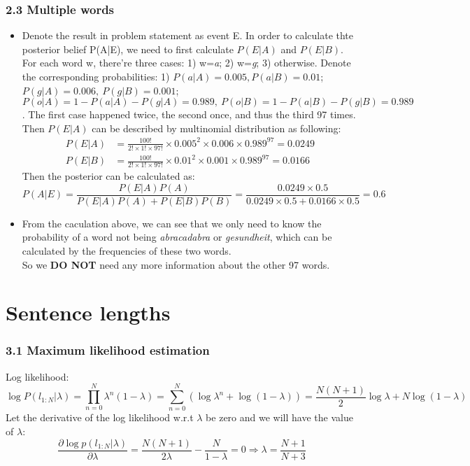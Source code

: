 \documentclass[twoside,10pt]{article}
\begin{document}
\subsubsection*{2.3 Multiple words}
\begin{itemize}
  \item Denote the result in problem statement as event E. In order to calculate
  thte posterior belief P(A|E), we need to first calculate $P(E|A)$ and
  $P(E|B)$. For each
  word w, there're three cases: 1) w=\textit{a}; 2) w=\textit{g}; 3) otherwise.
  Denote the corresponding probabilities: 1) $P(a|A) = 0.005, P(a|B) = 0.01$;
  $P(g|A) = 0.006,\ P(g|B) = 0.001$;
  $P(o|A) = 1 - P(a|A) - P(g|A) = 0.989,\ P(o|B) = 1 - P(a|B) - P(g|B)=0.989$. The first case happened twice, the
  second once, and thus the third 97 times. Then $P(E|A)$ can be described by
  multinomial distribution as following:
  \begin{align} 
    P(E|A) &=
    \frac{100!}{2!\times1!\times97!}\times0.005^{2}\times0.006\times0.989^{97} =
    0.0249\\
    P(E|B) &=
    \frac{100!}{2!\times1!\times97!}\times0.01^{2}\times0.001\times0.989^{97} =
    0.0166
  \end{align}
  Then the posterior can be calculated as:
  \begin{equation}
    P(A|E) = \frac{P(E|A)P(A)}{P(E|A)P(A)+P(E|B)P(B)} =
    \frac{0.0249\times0.5}{0.0249\times0.5+0.0166\times0.5} = 0.6 
  \end{equation}

\item From the caculation above, we can see that we only need to know the
  probability of a word not being \textit{abracadabra} or \textit{gesundheit},
  which can be calculated by the frequencies of these two words.\\ 
  So we \textbf{DO NOT}
  need any more information about the other 97 words.
\end{itemize}
\section{Sentence lengths}
\subsubsection*{3.1 Maximum likelihood estimation}
Log likelihood:
\begin{equation}
  \log P(l_{1:N}|\lambda) = \prod_{n=0}^{N}\lambda^n(1-\lambda) =
  \sum_{n=0}^{N} (\log\lambda^n + \log(1-\lambda)) = \frac{N(N+1)}{2}\log\lambda
  + N\log(1-\lambda)
\end{equation}
Let the derivative of the log likelihood w.r.t $\lambda$ be zero and we will
have the value of $\lambda$:
\begin{equation}
  \frac{\partial\log p(l_{1:N}|\lambda)}{\partial\lambda} =
  \frac{N(N+1)}{2\lambda} - \frac{N}{1-\lambda} = 0\Rightarrow
  \lambda=\frac{N+1}{N+3}
\end{equation}
\end{document}
